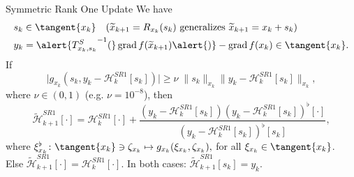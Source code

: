 \documentclass{beamer}
\begin{document}
\begin{frame}{Symmetric Rank One Update}
    We have
    \begin{align*}
        & s_k \in \tangent{x_k} \quad (\widetilde{x}_{k+1} = R_{x_k}(s_k) \text{ generalizes } \widetilde{x}_{k+1} = x_k + s_k) \\
        & y_k = \alert{{T^{S}_{x_k, s_k}}^{-1} (} \operatorname{grad}f(\widetilde{x}_{k+1}) \alert{)} - \operatorname{grad}f(x_k) \in \tangent{x_k}.
    \end{align*}
    If
    \begin{equation*}
        \lvert g_{x_k}(s_k, y_k - \mathcal{H}^{SR1}_k[s_k]) \rvert \geq \nu \; \lVert s_k \rVert_{x_k} \lVert y_k - \mathcal{H}^{SR1}_k[s_k] \rVert_{x_k},
    \end{equation*}
    where $\nu \in (0,1)$ (e.g. $\nu = 10^{-8}$), then
    \begin{equation*}
        \widetilde{\mathcal{H}}^{SR1}_{k+1} [\cdot] = \mathcal{H}^{SR1}_k [\cdot] + \frac{(y_k - \mathcal{H}^{SR1}_k [s_k]) (y_k - \mathcal{H}^{SR1}_k [s_k])^{\flat} [\cdot] }{(y_k - \mathcal{H}^{SR1}_k [s_k])^{\flat} [s_k]},
    \end{equation*}
    where $\xi^{\flat}_{x_k} \colon \tangent{x_k} \ni \zeta_{x_k} \mapsto g_{x_k}(\xi_{x_k}, \zeta_{x_k}),$ for all $\xi_{x_k} \in \tangent{x_k}$. \\
    Else $\widetilde{\mathcal{H}}^{SR1}_{k+1} [\cdot] = \mathcal{H}^{SR1}_k [\cdot]$. In both cases: $\widetilde{\mathcal{H}}^{SR1}_{k+1} [s_k] = y_k$.
\end{frame}
\end{document}
